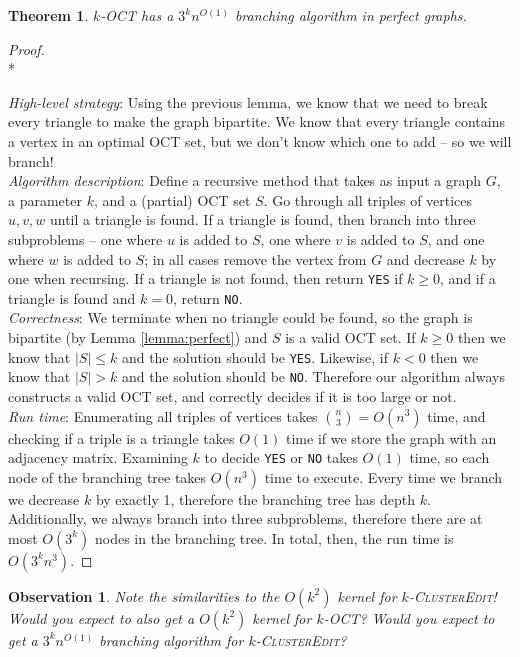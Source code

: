 \documentclass{article}
\newcommand{\problem}[1]{\textsc{#1}}
\newtheorem{theorem}{Theorem}
\newtheorem*{observation}{Observation}
\newcommand{\proofnewline}{\mbox{}\\*}
\begin{document}
\begin{theorem}
\problem{$k$-OCT} has a $3^k n^{O(1)}$ branching algorithm in perfect graphs.
\end{theorem}
\begin{proof}
\proofnewline

\noindent \emph{High-level strategy}: Using the previous lemma, we know that we need to break every triangle to make the graph bipartite. We know that every triangle contains a vertex in an optimal OCT set, but we don't know which one to add -- so we will branch!\\

\noindent \emph{Algorithm description}: Define a recursive method that takes as input a graph $G$, a parameter $k$, and a (partial) OCT set $S$. Go through all triples of vertices $u, v, w$ until a triangle is found. If a triangle is found, then branch into three subproblems -- one where $u$ is added to $S$, one where $v$ is added to $S$, and one where $w$ is added to $S$; in all cases remove the vertex from $G$ and decrease $k$ by one when recursing. If a triangle is not found, then return \texttt{YES} if $k \geq 0$, and if a triangle is found and \(k=0\), return \texttt{NO}.\\

\noindent \emph{Correctness}: We terminate when no triangle could be found, so the graph is bipartite (by Lemma \ref{lemma:perfect}) and $S$ is a valid OCT set. If $k \geq 0$ then we know that $|S| \leq k$ and the solution should be \texttt{YES}. Likewise, if $k < 0$ then we know that $|S| > k$ and the solution should be \texttt{NO}. Therefore our algorithm always constructs a valid OCT set, and correctly decides if it is too large or not.\\

\noindent \emph{Run time}: Enumerating all triples of vertices takes $\binom{n}{3} = O(n^3)$ time, and checking if a triple is a triangle takes $O(1)$ time if we store the graph with an adjacency matrix. Examining $k$ to decide \texttt{YES} or \texttt{NO} takes $O(1)$ time, so each node of the branching tree takes $O(n^3)$ time to execute. Every time we branch we decrease $k$ by exactly 1, therefore the branching tree has depth $k$. Additionally, we always branch into three subproblems, therefore there are at most $O(3^k)$ nodes in the branching tree. In total, then, the run time is $O(3^kn^3)$.
\end{proof}

\begin{observation}
Note the similarities to the $O(k^2)$ kernel for \problem{$k$-ClusterEdit}! Would you expect to also get a $O(k^2)$ kernel for \problem{$k$-OCT}? Would you expect to get a $3^k n^{O(1)}$ branching algorithm for \problem{$k$-ClusterEdit}?
\end{observation}
\end{document}
